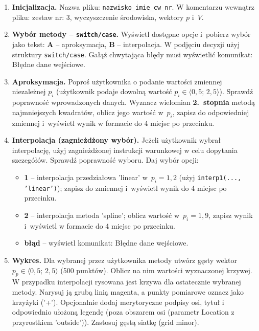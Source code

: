 \documentclass[a4paper,11pt]{article}
\begin{document}
\begin{enumerate}[leftmargin=*, label=\textbf{\arabic*.}, itemsep=2pt]

  \item \textbf{Inicjalizacja.}
    Nazwa pliku: \texttt{nazwisko\_imie\_cw\_nr}. W komentarzu wewnątrz pliku: zestaw nr: 3, wyczyszczenie środowiska, wektory $p$ i~$V$.

  \item \textbf{Wybór metody -- \texttt{switch/case}.}
    Wyświetl dostępne opcje i~pobierz wybór jako tekst: \textbf{A} -- aproksymacja, \textbf{B} -- interpolacja. W podjęciu decyzji użyj struktury \texttt{switch/case}. Gałąź chwytająca błędy musi wyświetlić komunikat: Błędne dane wejściowe.

  \item \textbf{Aproksymacja.}
    Poproś użytkownika o podanie wartości zmiennej niezależnej $p_i$ (użytkownik podaje dowolną wartość $p_i \in \langle 0{,}5;\,2{,}5 \rangle$). Sprawdź poprawność wprowadzonych danych. Wyznacz wielomian \textbf{2.~stopnia} metodą najmniejszych kwadratów, oblicz jego wartość w~$p_i$, zapisz do odpowiedniej zmiennej i~wyświetl wynik w formacie do 4 miejsc po przecinku.

  \item \textbf{Interpolacja (zagnieżdżony wybór).}
    Jeżeli użytkownik wybrał interpolację, użyj zagnieżdżonej instrukcji warunkowej w celu dopytania szczegółów. Sprawdź poprawność wyboru. Daj wybór opcji:
    \begin{itemize}[itemsep=1pt]
      \item \textbf{1} -- interpolacja przedziałowa 'linear' w~$p_i = 1{,}2$ (użyj \texttt{interp1(..., 'linear')}); zapisz do zmiennej i~wyświetl wynik do 4 miejsc po przecinku.
      \item \textbf{2} -- interpolacja metoda 'spline'; oblicz wartość w~$p_i = 1{,}9$, zapisz wynik i~wyświetl w formacie do 4 miejsc po przecinku.
      \item \textbf{błąd} -- wyświetl komunikat: Błędne dane wejściowe.
    \end{itemize}

  \item \textbf{Wykres.}
    Dla wybranej przez użytkownika metody utwórz gęsty wektor $p_p \in \langle 0{,}5;\,2{,}5 \rangle$ (500 punktów). Oblicz na nim wartości wyznaczonej krzywej. W przypadku interpolacji rysowana jest krzywa dla ostatecznie wybranej metody. Narysuj ją grubą linią magenta, a punkty pomiarowe oznacz jako krzyżyki ('+'). Opcjonalnie dodaj merytoryczne podpisy osi, tytuł i odpowiednio ułożoną legendę (poza obszarem osi (parametr Location z przyrostkiem 'outside')). Zastosuj gęstą siatkę (grid minor).

\end{enumerate}
\end{document}
